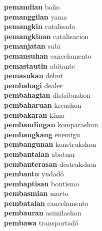 \textbf{pemandian } baño \\
\textbf{pemanggilan } yama \\
\textbf{pemangkin } catalisado \\
\textbf{pemangkinan } catalisacion \\
\textbf{pemanjatan } subi \\
\textbf{pemansuhan } cancelamento \\
\textbf{pemastautin } abitante \\
\textbf{pemasukan } debut \\
\textbf{pembahagi } dealer \\
\textbf{pembahagian } distribushon \\
\textbf{pembaharuan } kreashon \\
\textbf{pembakaran } kima \\
\textbf{pembandingan } komparashon \\
\textbf{pembangkang } enemigu \\
\textbf{pembangunan } konstrukshon \\
\textbf{pembantaian } abatuar \\
\textbf{pembanterasan } destrukshon \\
\textbf{pembantu } yudadó \\
\textbf{pembaptisan } boutismo \\
\textbf{pembasmian } morto \\
\textbf{pembatalan } cancelamento \\
\textbf{pembauran } asimilashon \\
\textbf{pembawa } transportadó \\
